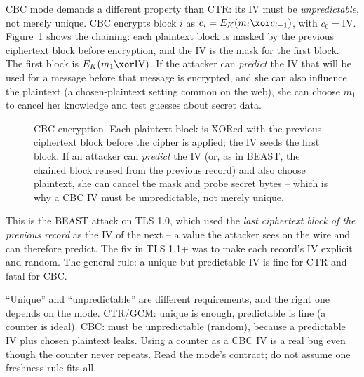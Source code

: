 CBC mode demands a different property than CTR: its IV must be \emph{unpredictable}, not merely unique. CBC encrypts block $i$ as $c_i = E_K(m_i \xor c_{i-1})$, with $c_0 = \mathrm{IV}$. Figure~\ref{ch38:fig-cbc} shows the chaining: each plaintext block is masked by the previous ciphertext block before encryption, and the IV is the mask for the first block. The first block is $E_K(m_1 \xor \mathrm{IV})$. If the attacker can \emph{predict} the IV that will be used for a message before that message is encrypted, and she can also influence the plaintext (a chosen-plaintext setting common on the web), she can choose $m_1$ to cancel her knowledge and test guesses about secret data. \begin{figure}[H]
\centering
{}
\caption{CBC encryption. Each plaintext block is XORed with the previous ciphertext block before the cipher is applied; the IV seeds the first block. If an attacker can \emph{predict} the IV (or, as in BEAST, the chained block reused from the previous record) and also choose plaintext, she can cancel the mask and probe secret bytes -- which is why a CBC IV must be unpredictable, not merely unique.}
\label{ch38:fig-cbc}
\end{figure}

This is the BEAST attack on TLS 1.0, which used the \emph{last ciphertext block of the previous record} as the IV of the next -- a value the attacker sees on the wire and can therefore predict. The fix in TLS 1.1+ was to make each record's IV explicit and random. The general rule: a unique-but-predictable IV is fine for CTR and fatal for CBC.

\begin{trapbox}
``Unique'' and ``unpredictable'' are different requirements, and the right one depends on the mode. CTR/GCM: unique is enough, predictable is fine (a counter is ideal). CBC: must be unpredictable (random), because a predictable IV plus chosen plaintext leaks. Using a counter as a CBC IV is a real bug even though the counter never repeats. Read the mode's contract; do not assume one freshness rule fits all.
\end{trapbox}


